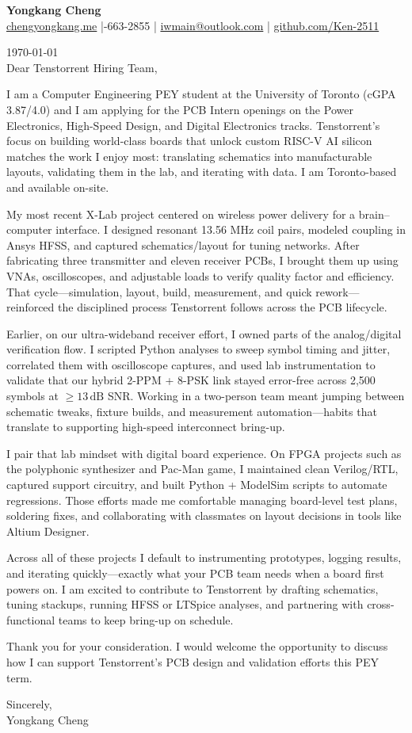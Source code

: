 \documentclass[11pt]{article}
\begin{document}
{\Large \textbf{Yongkang Cheng}}\\[2pt]
\href{https://chengyongkang.me/}{chengyongkang.me} \;|-663-2855 \;|\; \href{mailto:iwmain@outlook.com}{iwmain@outlook.com} \;|\; \href{https://github.com/Ken-2511}{github.com/Ken-2511}

\today\\[0.8em]

Dear Tenstorrent Hiring Team,

I am a Computer Engineering PEY student at the University of Toronto (cGPA 3.87/4.0) and I am applying for the PCB Intern openings on the Power Electronics, High-Speed Design, and Digital Electronics tracks. Tenstorrent’s focus on building world-class boards that unlock custom RISC-V AI silicon matches the work I enjoy most: translating schematics into manufacturable layouts, validating them in the lab, and iterating with data. I am Toronto-based and available on-site.

My most recent X-Lab project centered on wireless power delivery for a brain–computer interface. I designed resonant 13.56 MHz coil pairs, modeled coupling in Ansys HFSS, and captured schematics/layout for tuning networks. After fabricating three transmitter and eleven receiver PCBs, I brought them up using VNAs, oscilloscopes, and adjustable loads to verify quality factor and efficiency. That cycle—simulation, layout, build, measurement, and quick rework—reinforced the disciplined process Tenstorrent follows across the PCB lifecycle.

Earlier, on our ultra-wideband receiver effort, I owned parts of the analog/digital verification flow. I scripted Python analyses to sweep symbol timing and jitter, correlated them with oscilloscope captures, and used lab instrumentation to validate that our hybrid 2-PPM + 8-PSK link stayed error-free across 2,500 symbols at $\geq 13\,\mathrm{dB}$ SNR. Working in a two-person team meant jumping between schematic tweaks, fixture builds, and measurement automation—habits that translate to supporting high-speed interconnect bring-up.

I pair that lab mindset with digital board experience. On FPGA projects such as the polyphonic synthesizer and Pac-Man game, I maintained clean Verilog/RTL, captured support circuitry, and built Python + ModelSim scripts to automate regressions. Those efforts made me comfortable managing board-level test plans, soldering fixes, and collaborating with classmates on layout decisions in tools like Altium Designer.

Across all of these projects I default to instrumenting prototypes, logging results, and iterating quickly—exactly what your PCB team needs when a board first powers on. I am excited to contribute to Tenstorrent by drafting schematics, tuning stackups, running HFSS or LTSpice analyses, and partnering with cross-functional teams to keep bring-up on schedule.

Thank you for your consideration. I would welcome the opportunity to discuss how I can support Tenstorrent’s PCB design and validation efforts this PEY term.

\vspace{1em}
Sincerely,\\[1.2em]
Yongkang Cheng
\end{document}
